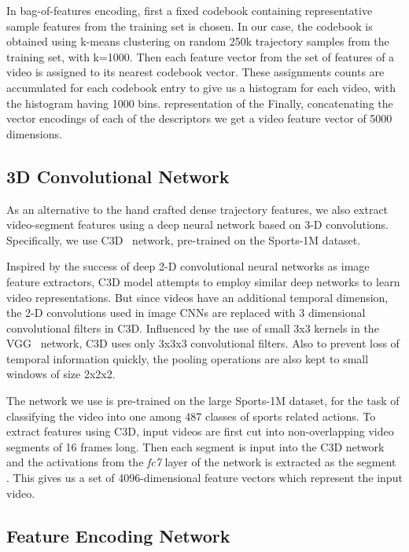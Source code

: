 In bag-of-features encoding, first a fixed codebook containing representative
sample features from the training set is chosen.
In our case, the codebook is obtained using k-means clustering on random 250k
trajectory samples from the training set, with k=1000.
Then each feature vector from the set of features of a video is assigned to its
nearest codebook vector.
These assignments counts are accumulated for each codebook entry to give us a
histogram for each video, with the histogram having 1000 bins. representation of the 
Finally, concatenating the vector encodings of each of the descriptors we get a
video feature vector of 5000 dimensions. 

\subsection{3D Convolutional Network}
As an alternative to the hand crafted dense trajectory features, we also extract
video-segment features using a deep neural network based on 3-D
convolutions. 
Specifically, we use C3D~\cite{DBLP:C3D} network, pre-trained on the Sports-1M
dataset.

Inspired by the success of deep 2-D convolutional neural networks as image
feature extractors, C3D model attempts to employ similar deep networks to learn
video representations.
But since videos have an additional temporal dimension, the 2-D convolutions
used in image CNNs are replaced with 3 dimensional convolutional filters in C3D.
Influenced by the use of small 3x3 kernels in the VGG~\cite{Simonyan14c}
network, C3D uses only 3x3x3 convolutional filters.
Also to prevent loss of temporal information quickly, the pooling operations are
also kept to small windows of size 2x2x2.

The network we use is pre-trained on the large Sports-1M dataset, for the task
of classifying the video into one among 487 classes of sports related actions.
To extract features using C3D, input videos are first cut into non-overlapping
video segments of 16 frames long.
Then each segment is input into the C3D network and the activations from the
\emph{fc7} layer of the network is extracted as the segment .
This gives us a set of 4096-dimensional feature vectors which represent the
input video.



\subsection{Feature Encoding Network}

